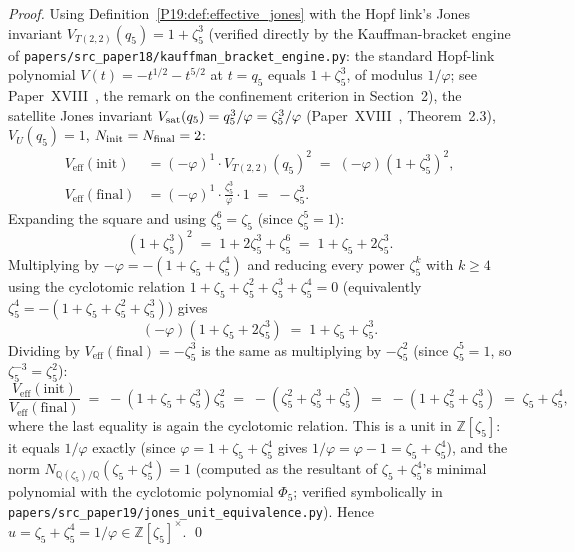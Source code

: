 \documentclass[11pt,a4paper]{article}
\theoremstyle{definition}\newtheorem{definition}[theorem]{Definition}
\theoremstyle{remark}
\newcommand{\vp}{\varphi}
\newcommand{\Jones}{V}
\begin{document}
\begin{proof}
Using Definition~\ref{P19:def:effective_jones} with the Hopf link's
Jones invariant $\Jones_{T(2,2)}(q_5)=1+\zeta_5^3$
(verified directly by the Kauffman-bracket engine of
\texttt{papers/src\_paper18/kauffman\_bracket\_engine.py}: the
standard Hopf-link polynomial $V(t)=-t^{1/2}-t^{5/2}$ at $t=q_5$
equals $1+\zeta_5^3$, of modulus $1/\vp$; see Paper~XVIII~\cite{Paper18}, %
the remark on the confinement criterion in Section~2), the
satellite Jones invariant
$\Jones_{\rm sat}(q_5)=q_5^3/\vp=\zeta_5^3/\vp$
(Paper~XVIII~\cite{Paper18}, Theorem~2.3), %
$\Jones_U(q_5)=1$, $N_{\rm init}=N_{\rm final}=2$:
\begin{align}
  \Jones_{\mathrm{eff}}(\mathrm{init})
  &= (-\vp)^{1}\cdot\Jones_{T(2,2)}(q_5)^2
  \;=\; (-\vp)(1+\zeta_5^3)^2,
  \label{P19:eq:V_init_ch1}\\[4pt]
  \Jones_{\mathrm{eff}}(\mathrm{final})
  &= (-\vp)^{1}\cdot\frac{\zeta_5^3}{\vp}\cdot1
  \;=\; -\zeta_5^3.
  \label{P19:eq:V_final_ch1}
\end{align}
Expanding the square and using $\zeta_5^6=\zeta_5$ (since $\zeta_5^5=1$):
\begin{equation}
  (1+\zeta_5^3)^2 \;=\; 1+2\zeta_5^3+\zeta_5^6 \;=\; 1+\zeta_5+2\zeta_5^3.
  \label{P19:eq:ch1_square}
\end{equation}
Multiplying by $-\vp=-(1+\zeta_5+\zeta_5^4)$ and reducing every power
$\zeta_5^k$ with $k\geq4$ using the cyclotomic relation
$1+\zeta_5+\zeta_5^2+\zeta_5^3+\zeta_5^4=0$ (equivalently
$\zeta_5^4=-(1+\zeta_5+\zeta_5^2+\zeta_5^3)$) gives
\begin{equation}
  (-\vp)(1+\zeta_5+2\zeta_5^3) \;=\; 1+\zeta_5+\zeta_5^3.
  \label{P19:eq:ch1_numerator}
\end{equation}
Dividing by $\Jones_{\mathrm{eff}}(\mathrm{final})=-\zeta_5^3$ is the same
as multiplying by $-\zeta_5^2$ (since $\zeta_5^5=1$, so
$\zeta_5^{-3}=\zeta_5^2$):
\begin{equation}
  \frac{\Jones_{\mathrm{eff}}(\mathrm{init})}
       {\Jones_{\mathrm{eff}}(\mathrm{final})}
  \;=\; -(1+\zeta_5+\zeta_5^3)\zeta_5^2
  \;=\; -(\zeta_5^2+\zeta_5^3+\zeta_5^5)
  \;=\; -(1+\zeta_5^2+\zeta_5^3)
  \;=\; \zeta_5+\zeta_5^4,
  \label{P19:eq:ch1_unit}
\end{equation}
where the last equality is again the cyclotomic relation. This is a
unit in $\mathbb{Z}[\zeta_5]$: it equals $1/\vp$ exactly (since
$\vp=1+\zeta_5+\zeta_5^4$ gives $1/\vp=\vp-1=\zeta_5+\zeta_5^4$), and
the norm $N_{\mathbb{Q}(\zeta_5)/\mathbb{Q}}(\zeta_5+\zeta_5^4)=1$
(computed as the resultant of $\zeta_5+\zeta_5^4$'s minimal polynomial
with the cyclotomic polynomial $\Phi_5$; verified symbolically in
\texttt{papers/src\_paper19/jones\_unit\_equivalence.py}).
Hence $u=\zeta_5+\zeta_5^4=1/\vp\in\mathbb{Z}[\zeta_5]^\times$.
\qed
\end{proof}
\end{document}
